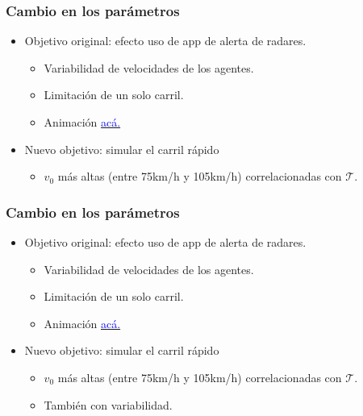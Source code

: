\documentclass[10pt, compress]{beamer}
\begin{document}
\begin{frame}[fragile]
\frametitle{Cambio en los par\'ametros}

\begin{itemize}
\item Objetivo original: efecto uso de app de alerta de radares.
	\begin{itemize}
	\item Variabilidad de velocidades de los agentes.
	\item Limitaci\'on de un solo carril.
	\item Animaci\'on \href{https://youtu.be/NnljPUTmnGE}{\textcolor{blue}{ac\'a.}}
	\end{itemize}
\item Nuevo objetivo: simular el carril r\'apido
	\begin{itemize}
	\item $v_0$ m\'as altas (entre 75km/h y 105km/h) correlacionadas con $\mathcal{T}$.
	\end{itemize}
\end{itemize}
\addtocounter{framenumber}{-1}
\end{frame}

\begin{frame}[fragile]
\frametitle{Cambio en los par\'ametros}

\begin{itemize}
\item Objetivo original: efecto uso de app de alerta de radares.
	\begin{itemize}
	\item Variabilidad de velocidades de los agentes.
	\item Limitaci\'on de un solo carril.
	\item Animaci\'on \href{https://youtu.be/NnljPUTmnGE}{\textcolor{blue}{ac\'a.}}
	\end{itemize}
\item Nuevo objetivo: simular el carril r\'apido
	\begin{itemize}
	\item $v_0$ m\'as altas (entre 75km/h y 105km/h) correlacionadas con $\mathcal{T}$.
	\item Tambi\'en con variabilidad.
	\end{itemize}
\end{itemize}
\addtocounter{framenumber}{-1}
\end{frame}
\end{document}
